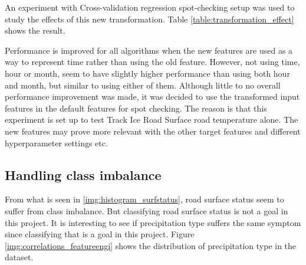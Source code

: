 	An experiment with Cross-validation regression spot-checking setup was used to study the effects of this new transformation. Table \ref{table:transformation_effect} shows the result.

	\begin{table}[H] %
	\centering
	\caption{Experiment to see the effects of transforming the time feature is relevant to use as input feature. }
	\end{table}

	Performance is improved for all algorithms when the new features are used as a way to represent time rather than using the old feature. However, not using time, hour or month, seem to have slightly higher performance than using both hour and month, but similar to using either of them. Although little to no overall performance improvement was made, it was decided to use the transformed input features in the default features for spot checking. The reason is that this experiment is set up to test Track Ice Road Surface road temperature alone. The new features may prove more relevant with the other target features and different hyperparameter settings etc.


\subsection{Handling class imbalance} \label{sec:class_imbalance}
	From what is seen in \ref{img:histogram_surfstatus}, road surface status seem to suffer from class imbalance. But classifying road surface status is not a goal in this project. It is interesting to see if precipitation type suffers the same symptom since classifying that is a goal in this project. Figure \ref{img:correlations_featureengi} shows the distribution of precipitation type in the dataset. 
	
